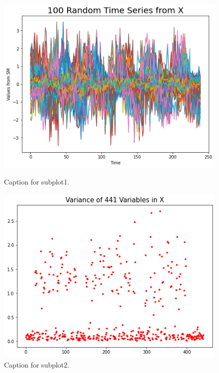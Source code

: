 \documentclass[a4paper, 11pt]{article}
\begin{document}
\begin{figure}[h]%
    \centering

    \begin{minipage}{0.45\textwidth}
        \centering
        \includegraphics[width=\linewidth]{../graphs/subplot1}
        \caption{Caption for subplot1.}
        \label{fig:subplot1}
        \end{minipage}
    \hfill
    \begin{minipage}{0.45\textwidth}
        \centering
    \includegraphics[width=\linewidth]{../graphs/subplot2}
    \caption{Caption for subplot2.}
    \label{fig:subplot2}
    \end{minipage}

\end{figure}
\end{document}
